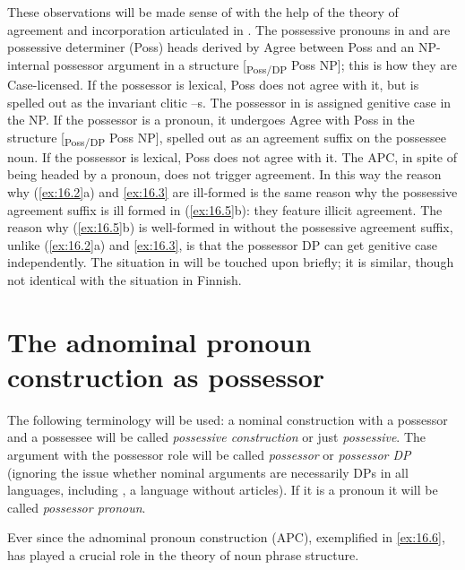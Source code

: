 \documentclass[output=paper]{langsci/langscibook}
\begin{document}
\begin{sloppypar}
These observations will be made sense of with the help of the theory of
agreement and incorporation articulated in \textcite{Roberts2010,Roberts2010b}.
The possessive pronouns in  and  are possessive determiner
(Poss) heads derived by Agree between Poss and an NP-internal possessor
argument in a structure [\textsubscript{Poss/DP} Poss NP]; this is how they are
Case-licensed. If the possessor is lexical, Poss does not agree with it, but is
spelled out as the invariant clitic –s. The possessor in  is
assigned genitive case in the NP. If the possessor is a
pronoun, it undergoes Agree with Poss in the structure [\textsubscript{Poss/DP}
Poss NP], spelled out as an agreement suffix on the possessee noun. If the
possessor is lexical, Poss does not agree with it. The \gls{APC}, in spite of being headed by a pronoun, does not trigger
agreement.  In this way the reason why (\ref{ex:16.2}a) and
\eqref{ex:16.3} are ill-formed is the same reason why the possessive
agreement suffix is ill formed in  (\ref{ex:16.5}b): they
feature illicit agreement. The reason why (\ref{ex:16.5}b) is well-formed
in  without the possessive agreement suffix, unlike
(\ref{ex:16.2}a) and \eqref{ex:16.3}, is that the possessor DP can get
genitive case independently. The situation in 
will be touched upon briefly; it is similar, though not identical with the
situation in Finnish.
\end{sloppypar}

\section{The adnominal pronoun construction as possessor}\label{sec:16.2}

The following terminology will be used: a nominal construction with a possessor
and a possessee will be called \emph{possessive construction} or just
\emph{possessive}. The argument with the possessor role will be called
\emph{possessor} or \emph{possessor DP} (ignoring the issue whether nominal
arguments are necessarily DPs in all languages, including , a language
without articles). If it is a pronoun it will be called \emph{possessor
pronoun}.

Ever since \citet{Postal1969} the adnominal pronoun construction (\gls{APC}),
exemplified in \eqref{ex:16.6}, has played a crucial role in the theory of
noun phrase structure.
\end{document}
